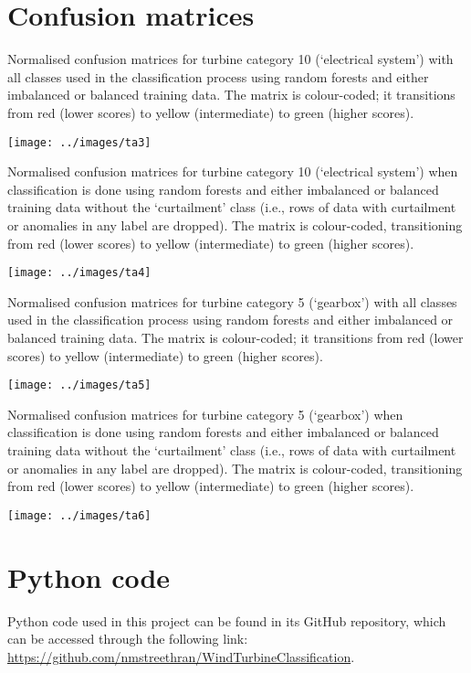 \chapter{Confusion matrices}\label{a4}

\begin{table}
  \centering
  \captionsetup{labelformat=empty,list=no}
  \caption{Normalised confusion matrices for turbine category 10 (`electrical system') with all classes used in the classification process using random forests and either imbalanced or balanced training data. The matrix is colour-coded; it transitions from red (lower scores) to yellow (intermediate) to green (higher scores).}
  \texttt{[image: ../images/ta3]}
\end{table}

\begin{table}
  \centering
  \captionsetup{labelformat=empty,list=no}
  \caption{Normalised confusion matrices for turbine category 10 (`electrical system') when classification is done using random forests and either imbalanced or balanced training data without the `curtailment' class (i.e., rows of data with curtailment or anomalies in any label are dropped). The matrix is colour-coded, transitioning from red (lower scores) to yellow (intermediate) to green (higher scores).}
  \texttt{[image: ../images/ta4]}
\end{table}

\begin{table}
  \centering
  \captionsetup{labelformat=empty,list=no}
  \caption{Normalised confusion matrices for turbine category 5 (`gearbox') with all classes used in the classification process using random forests and either imbalanced or balanced training data. The matrix is colour-coded; it transitions from red (lower scores) to yellow (intermediate) to green (higher scores).}
  \texttt{[image: ../images/ta5]}
\end{table}

\begin{table}
  \centering
  \captionsetup{labelformat=empty,list=no}
  \caption{Normalised confusion matrices for turbine category 5 (`gearbox') when classification is done using random forests and either imbalanced or balanced training data without the `curtailment' class (i.e., rows of data with curtailment or anomalies in any label are dropped). The matrix is colour-coded, transitioning from red (lower scores) to yellow (intermediate) to green (higher scores).}
  \texttt{[image: ../images/ta6]}
\end{table}

\chapter{Python code}\label{a5}

Python code used in this project can be found in its GitHub repository, which can be accessed through the following link: \url{https://github.com/nmstreethran/WindTurbineClassification}.

